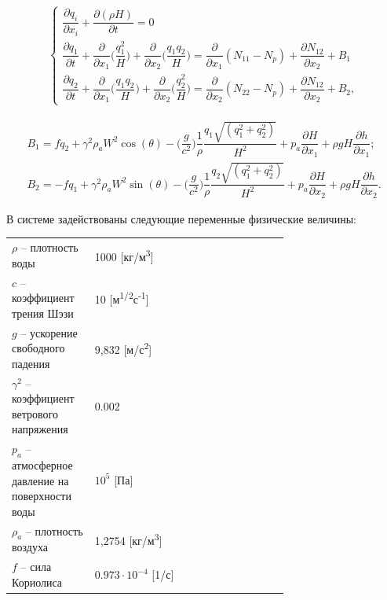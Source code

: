 \documentclass[14pt]{extreport}
\begin{document}
\begin{eqnarray}\label{eq:task:1}
\begin{cases}
\dfrac{ \partial q_i}{\partial x_i} + \dfrac{\partial(\rho H)}{\partial t} = 0 \\
\dfrac{\partial q_1}{\partial t} + \dfrac{\partial}{\partial x_1} \bigg(\dfrac{q_1^2}{H}\bigg)+\dfrac{\partial }{\partial x_2}\bigg(\dfrac{q_1 q_2}{H}\bigg) = \dfrac{\partial}{\partial x_1} (N_{11}-N_p) + \dfrac{\partial N_{12}}{\partial x_2} + B_1 \\
\dfrac{\partial q_2}{\partial t} + \dfrac{\partial}{\partial x_1} \bigg(\dfrac{q_1 q_2}{H}\bigg)+\dfrac{\partial }{\partial x_2}\bigg(\dfrac{q_2^2}{H}\bigg) = \dfrac{\partial}{\partial x_2} (N_{22}-N_p) + \dfrac{\partial N_{12}}{\partial x_2} + B_2,
\end{cases}
\end{eqnarray}


\begin{equation}\label{eq:task:2}
\begin{aligned}
B_1=fq_2+\gamma^2\rho_aW^2\cos(\theta)-\bigg(\dfrac{g}{c^2}\bigg)\dfrac{1}{\rho}\dfrac{q_1\sqrt{(q_1^2+q_2^2)}}{H^2} + p_a \dfrac{\partial H}{\partial x_1} + \rho gH\dfrac{\partial h}{\partial x_1}; \\
B_2=-fq_1+\gamma^2\rho_aW^2\sin(\theta)-\bigg(\dfrac{g}{c^2}\bigg)\dfrac{1}{\rho}\dfrac{q_2\sqrt{(q_1^2+q_2^2)}}{H^2} + p_a \dfrac{\partial H}{\partial x_2} + \rho gH\dfrac{\partial h}{\partial x_2}.
\end{aligned}
\end{equation}

В системе задействованы следующие переменные физические величины:

\begin{threeparttable}
\begin{longtable}[H]{lp{0.7\linewidth}}
{$\rho$} -- плотность воды & 1000 [кг/м\textsuperscript3] \\
{$c$} -- коэффициент трения Шэзи & 10 [м\textsuperscript{1/2}с\textsuperscript{-1}] \\
{$g$} -- ускорение свободного падения & 9,832 [м/с\textsuperscript{2}] \\
{$\gamma^2$} -- коэффициент ветрового напряжения & 0.002 \\

{$p_a$} -- атмосферное давление на поверхности воды & $10^5$ [Па] \\
{$\rho_a$} -- плотность воздуха & 1,2754 [кг/м\textsuperscript3] \\
{$f$} -- сила Кориолиса & $0.973 \cdot 10^{-4}$ [1/с] \\
\end{longtable} 
\end{threeparttable}
\end{document}
